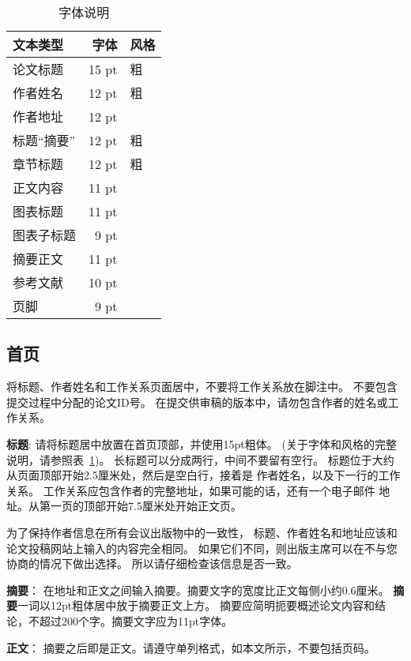 \documentclass[11pt]{article}
\begin{document}
\begin{CJK*}{UTF8}{gbsn}
\begin{table}[h]
\begin{center}
\begin{tabular}{|l|rl|}
\hline \bf 文本类型 & \bf 字体 & \bf 风格 \\ \hline
论文标题 & 15 pt & 粗 \\
作者姓名 & 12 pt & 粗 \\
作者地址 & 12 pt & \\
标题“摘要” & 12 pt & 粗 \\
章节标题 & 12 pt & 粗 \\
正文内容 & 11 pt  &\\
图表标题 & 11 pt & \\
图表子标题 & 9 pt & \\
摘要正文 & 11 pt & \\
参考文献 & 10 pt & \\
页脚 & 9 pt & \\
\hline
\end{tabular}
\end{center}
\caption{\label{font-table} 字体说明}
\end{table}

\subsection{首页}
\label{ssec:first}

将标题、作者姓名和工作关系页面居中，不要将工作关系放在脚注中。
不要包含提交过程中分配的论文ID号。
在提交供审稿的版本中，请勿包含作者的姓名或工作关系。

{\bf 标题}: 请将标题居中放置在首页顶部，并使用15pt粗体。 (关于字体和风格的完整说明，请参照表~\ref{font-table})。
长标题可以分成两行，中间不要留有空行。 
标题位于大约从页面顶部开始2.5厘米处，然后是空白行，接着是
作者姓名，以及下一行的工作关系。
工作关系应包含作者的完整地址，如果可能的话，还有一个电子邮件
地址。从第一页的顶部开始7.5厘米处开始正文页。

为了保持作者信息在所有会议出版物中的一致性，
标题、作者姓名和地址应该和论文投稿网站上输入的内容完全相同。
如果它们不同，则出版主席可以在不与您协商的情况下做出选择。
所以请仔细检查该信息是否一致。


{\bf 摘要}：
在地址和正文之间输入摘要。摘要文字的宽度比正文每侧小约0.6厘米。
{\bf 摘要}一词以12pt粗体居中放于摘要正文上方。
摘要应简明扼要概述论文内容和结论，不超过200个字。摘要文字应为11pt字体。

{\bf 正文}：
摘要之后即是正文。请遵守单列格式，如本文所示，不要包括页码。


\end{CJK*}
\end{document}

